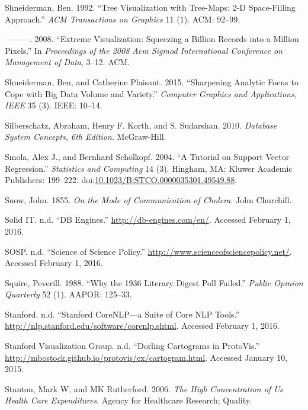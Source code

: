 \documentclass[]{krantz}
\begin{document}
\hypertarget{ref-shneiderman1992tree}{}
Shneiderman, Ben. 1992. ``Tree Visualization with Tree-Maps: 2-D
Space-Filling Approach.'' \emph{ACM Transactions on Graphics} 11 (1).
ACM: 92--99.

\hypertarget{ref-shneiderman2008extreme}{}
---------. 2008. ``Extreme Visualization: Squeezing a Billion Records
into a Million Pixels.'' In \emph{Proceedings of the 2008 Acm Sigmod
International Conference on Management of Data}, 3--12. ACM.

\hypertarget{ref-shneiderman2015sharpening}{}
Shneiderman, Ben, and Catherine Plaisant. 2015. ``Sharpening Analytic
Focus to Cope with Big Data Volume and Variety.'' \emph{Computer
Graphics and Applications, IEEE} 35 (3). IEEE: 10--14.

\hypertarget{ref-silberschatz2010database}{}
Silberschatz, Abraham, Henry F. Korth, and S. Sudarshan. 2010.
\emph{Database System Concepts, 6th Edition}. McGraw-Hill.

\hypertarget{ref-SmolaRegression04}{}
Smola, Alex J., and Bernhard Schölkopf. 2004. ``A Tutorial on Support
Vector Regression.'' \emph{Statistics and Computing} 14 (3). Hingham,
MA: Kluwer Academic Publishers: 199--222.
doi:\href{https://doi.org/10.1023/B:STCO.0000035301.49549.88}{10.1023/B:STCO.0000035301.49549.88}.

\hypertarget{ref-snow1855mode}{}
Snow, John. 1855. \emph{On the Mode of Communication of Cholera}. John
Churchill.

\hypertarget{ref-DBengines}{}
Solid IT. n.d. ``DB Engines.'' \url{http://db-engines.com/en/}. Accessed
February 1, 2016.

\hypertarget{ref-SOSP}{}
SOSP. n.d. ``Science of Science Policy.''
\url{http://www.scienceofsciencepolicy.net/}. Accessed February 1, 2016.

\hypertarget{ref-squire19881936}{}
Squire, Peverill. 1988. ``Why the 1936 Literary Digest Poll Failed.''
\emph{Public Opinion Quarterly} 52 (1). AAPOR: 125--33.

\hypertarget{ref-corenlp}{}
Stanford. n.d. ``Stanford CoreNLP---a Suite of Core NLP Tools.''
\url{http://nlp.stanford.edu/software/corenlp.shtml}. Accessed February
1, 2016.

\hypertarget{ref-ProtoVis2015}{}
Stanford Visualization Group. n.d. ``Dorling Cartograms in ProtoVis.''
\url{http://mbostock.github.io/protovis/ex/cartogram.html}. Accessed
January 10, 2015.

\hypertarget{ref-stanton2006high}{}
Stanton, Mark W, and MK Rutherford. 2006. \emph{The High Concentration
of Us Health Care Expenditures}. Agency for Healthcare Research;
Quality.
\end{document}
